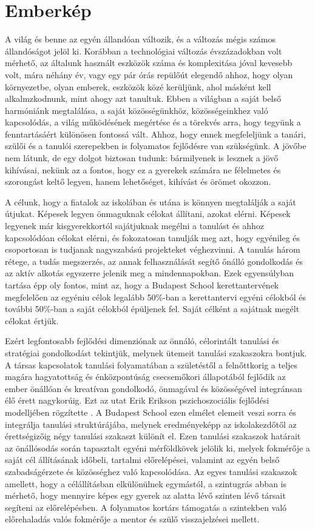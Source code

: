 \section{Emberkép}
\label{sec:gyerekkep}

A világ és benne az egyén állandóan változik, és a változás mégis számos
állandóságot jelöl ki. Korábban a technológiai változás évszázadokban volt
mérhető, az általunk használt eszközök száma és komplexitása jóval kevesebb
volt, mára
néhány év, vagy egy pár órás repülőút elegendő ahhoz, hogy olyan környezetbe,
olyan emberek, eszközök közé kerüljünk, ahol másként kell alkalmzkodnunk, mint
ahogy azt tanultuk. Ebben a világban a saját belső harmóniánk megtalálása, a
saját közösségünkhöz, közösségeinkhez való kapcsolódás, a világ működésének
megértése és a törekvés arra, hogy tegyünk a fenntartásáért különösen fontossá
vált. Ahhoz, hogy ennek megfeleljünk a tanári, szülői és a tanulói szerepekben
is folyamatos fejlődésre van szükségünk.
A jövőbe nem látunk, de egy dolgot biztosan tudunk: bármilyenek is lesznek a
jövő
kihívásai, nekünk az a fontos, hogy ez a gyerekek számára ne félelmetes és
szorongást keltő legyen, hanem lehetőséget, kihívást és örömet okozzon.

A célunk, hogy a fiatalok az iskolában és utána is könnyen megtalálják a saját
útjukat. Képesek legyen önmaguknak célokat állítani, azokat elérni. Képesek
legyenek már kisgyerekkortól sajátjuknak megélni a tanulást és ahhoz
kapcsolódóan célokat elérni, és fokozatosan tanulják meg azt, hogy egyénileg és
csoportosan is tudjanak nagyszabású projekteket véghezvinni.
A tanulás három rétege, a tudás megszerzés, az annak felhasználását segítő
őnálló gondolkodás és az aktív alkotás egyszerre jelenik meg a mindennapokban.
Ezek egyensúlyban tartása épp oly fontos, mint az, hogy a Budapest School
kerettantervének megfelelően az egyéniu célok legalább 50\%-ban a kerettantervi
egyéni célokból és további 50\%-ban a saját célokból épüljenek fel. Saját
célként a sajátnak megélt célokat értjük.

Ezért legfontosabb fejlődési dimenziónak az önnáló, célorintált tanulási és
stratégiai gondolkodást tekintjük, melynek ütemeit tanulási szakaszokra
bontjuk. A társas kapcsolatok tanulási folyamatában a születéstől a
felnőttkorig a teljes magára hagyatottság és énközpontúság csecsemőkori
állapotából fejlődik az ember önállóan és kreatívan gondolkodó, önmagával és
közösségével integránsan élő érett nagykorúig. Ezt az utat Erik Erikson
pszichoszociális fejlődési modelljében rögzítette \citep{Erikson91}. A Budapest
School ezen elmélet elemeit veszi sorra és integrálja tanulási struktúrájába,
melynek eredményeképp az iskolakezdőtől az érettségizőig négy tanulási szakaszt
különít el. Ezen tanulási szakaszok határait az önállósodás során tapasztalt
egyéni mérföldkövek jelölik ki, melyek fokmérője a saját cél állításának
időbeli, tartalmi előrelépései, valamint az egyén belső szabadságérzete és
közösséghez való kapcsolódása.
Az egyes tanulási szakaszok amellett, hogy a célállításban elkülönülnek
egymástól, a szintugrás abban is mérhető, hogy mennyire képes egy gyerek az
alatta lévő szinten lévő társait segíteni az előrelépésben. A folyamatos
kortárs támogatás a szintekben való előrehaladás valós fokmérője a mentor és
szülő visszajelzései mellett.

